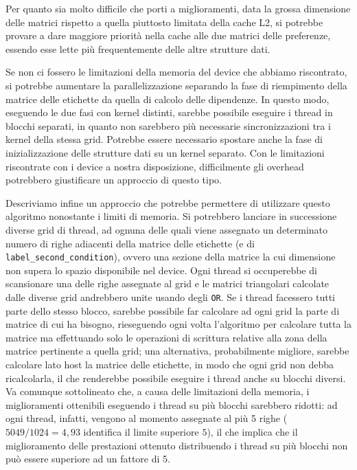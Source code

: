 \documentclass[12pt]{article}
\begin{document}
    Per quanto sia molto difficile che porti a miglioramenti, data la grossa dimensione delle matrici rispetto a quella piuttosto limitata della cache L2, si potrebbe provare a dare maggiore priorità nella cache alle due matrici delle preferenze, essendo esse lette più frequentemente delle altre strutture dati.

    Se non ci fossero le limitazioni della memoria del device che abbiamo riscontrato, si potrebbe aumentare la parallelizzazione separando la fase di riempimento della matrice delle etichette da quella di calcolo delle dipendenze. In questo modo, eseguendo le due fasi con kernel distinti, sarebbe possibile eseguire i thread in blocchi separati, in quanto non sarebbero più necessarie sincronizzazioni tra i kernel della stessa grid. Potrebbe essere necessario spostare anche la fase di inizializzazione delle strutture dati su un kernel separato. Con le limitazioni riscontrate con i device a nostra disposizione, difficilmente gli overhead potrebbero giustificare un approccio di questo tipo.

    Descriviamo infine un approccio che potrebbe permettere di utilizzare questo algoritmo nonostante i limiti di memoria. Si potrebbero lanciare in successione diverse grid di thread, ad ognuna delle quali viene assegnato un determinato numero di righe adiacenti della matrice delle etichette (e di \texttt{label\_second\_condition}), ovvero una sezione della matrice la cui dimensione non supera lo spazio disponibile nel device. Ogni thread si occuperebbe di scansionare una delle righe assegnate al grid e le matrici triangolari calcolate dalle diverse grid andrebbero unite usando degli \texttt{OR}. Se i thread facessero tutti parte dello stesso blocco, sarebbe possibile far calcolare ad ogni grid la parte di matrice di cui ha bisogno, rieseguendo ogni volta l'algoritmo per calcolare tutta la matrice ma effettuando solo le operazioni di scrittura relative alla zona della matrice pertinente a quella grid; una alternativa, probabilmente migliore, sarebbe calcolare lato host la matrice delle etichette, in modo che ogni grid non debba ricalcolarla, il che renderebbe possibile eseguire i thread anche su blocchi diversi. Va comunque sottolineato che, a causa delle limitazioni della memoria, i miglioramenti ottenibili eseguendo i thread su più blocchi sarebbero ridotti: ad ogni thread, infatti, vengono al momento assegnate al più 5 righe ($5049/1024=4,93$ identifica il limite superiore $5$), il che implica che il miglioramento delle prestazioni ottenuto distribuendo i thread su più blocchi non può essere superiore ad un fattore di 5.
    
\end{document}
